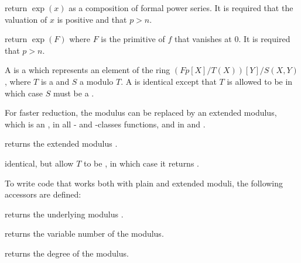 





 return $\exp(x)$
as a composition of formal power series.
It is required that the valuation of $x$ is positive and that $p>n$.


 return $\exp(F)$
where $F$ is the primitive of $f$ that vanishes at $0$.
It is required that $p>n$.



A  is a  which represents an element of the ring
$(Fp[X]/T(X))[Y]/S(X,Y)$, where $T$ is a  and $S$ a 
modulo $T$.  A  is identical except that $T$ is allowed to be
 in which case $S$ must be a .


For faster reduction, the modulus  can be replaced by an extended
modulus, which is an , in all - and -classes
functions, and in  and .

 returns the extended modulus
.

 identical, but allow $T$ to
be , in which case it returns .

To write code that works both with plain and extended moduli, the following
accessors are defined:

 returns the underlying modulus .

 returns the variable number of the modulus.

 returns the degree of the modulus.

